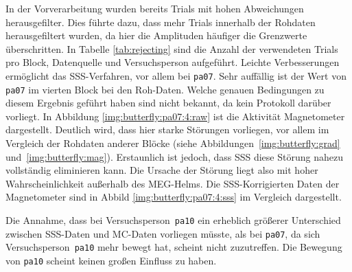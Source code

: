 \documentclass[doc,a4paper,12pt]{apa6}
\begin{document}
In der Vorverarbeitung wurden bereits Trials mit hohen Abweichungen herausgefilter. Dies führte dazu, dass mehr Trials innerhalb der Rohdaten herausgefiltert wurden, da hier die Amplituden häufiger die Grenzwerte überschritten. In Tabelle \ref{tab:rejecting} sind die Anzahl der verwendeten Trials pro Block, Datenquelle und Versuchsperson aufgeführt. Leichte Verbesserungen ermöglicht das SSS-Verfahren, vor allem bei \texttt{pa07}. Sehr auffällig ist der Wert von \texttt{pa07} im vierten Block bei den Roh-Daten. Welche genauen Bedingungen zu diesem Ergebnis geführt haben sind nicht bekannt, da kein Protokoll darüber vorliegt. In Abbildung \ref{img:butterfly:pa07:4:raw} ist die Aktivität Magnetometer dargestellt. Deutlich wird, dass hier starke Störungen vorliegen, vor allem im Vergleich der Rohdaten anderer Blöcke (siehe Abbildungen~\ref{img:butterfly:grad} und~\ref{img:butterfly:mag}). Erstaunlich ist jedoch, dass SSS diese Störung nahezu vollständig eliminieren kann. Die Ursache der Störung liegt also mit hoher Wahrscheinlichkeit außerhalb des MEG-Helms. Die SSS-Korrigierten Daten der Magnetometer sind in Abbild \ref{img:butterfly:pa07:4:sss} im Vergleich dargestellt.

Die Annahme, dass bei Versuchsperson~\texttt{pa10} ein erheblich größerer Unterschied zwischen SSS-Daten und MC-Daten vorliegen müsste, als bei \texttt{pa07}, da sich Versuchsperson~\texttt{pa10} mehr bewegt hat, scheint nicht zuzutreffen. Die Bewegung von \texttt{pa10} scheint keinen großen Einfluss zu haben. 

\end{document}
